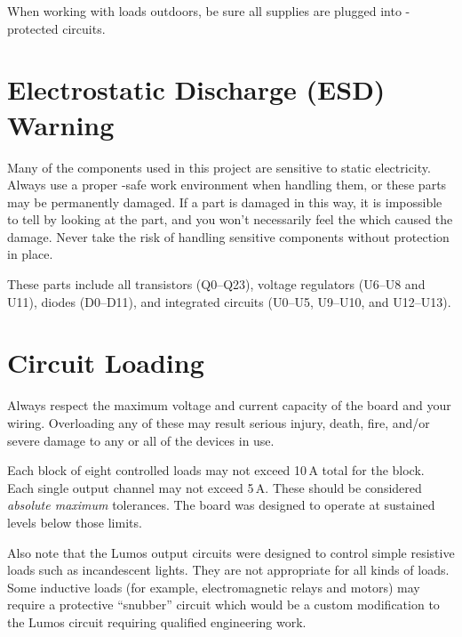 \documentclass[letterpaper,twoside,onecolumn,openright,final]{memoir}
\begin{document}
When working with loads outdoors, be sure all supplies are plugged into -protected
circuits.

\section{Electrostatic Discharge (ESD) Warning}
Many of the components used in this project are sensitive to static electricity.  Always use a proper
-safe work environment when handling them, or these parts may be permanently damaged.  If
a part is damaged in this way, 
it is impossible to tell by looking at the part, and you won't necessarily
feel the  which caused the damage.  Never take the risk of handling sensitive components
without  protection in place.

These parts include all transistors (Q0--Q23), voltage regulators (U6--U8 and U11), diodes (D0--D11),
and integrated circuits (U0--U5, U9--U10, and U12--U13).

\section{Circuit Loading}
Always respect the maximum voltage and current capacity of the board and your wiring.  Overloading any
of these may result serious injury, death, fire, and/or severe damage to any or all of the devices in use.

Each block of eight controlled loads may not exceed 
10\,A total for the block.  
Each single output channel
may not exceed 5\,A.  These should be considered \emph{absolute maximum} tolerances.  The board was designed
to operate at sustained levels below those limits.

Also note that the Lumos output circuits were designed to control simple resistive loads such as
incandescent lights.  They are not appropriate for all kinds of loads.  Some inductive loads
(for example, electromagnetic relays and motors) may require a protective ``snubber'' circuit
which would be a custom modification to the Lumos circuit requiring qualified engineering work.
%
\end{document}
